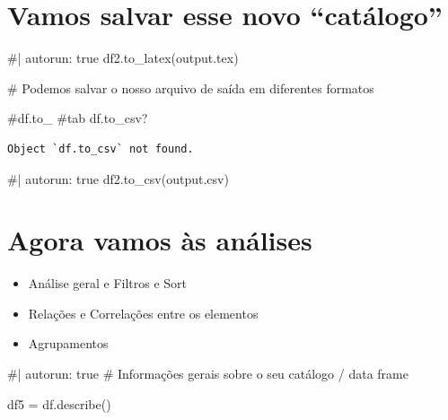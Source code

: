 \documentclass[
  letterpaper,
  DIV=11,
  numbers=noendperiod]{scrreprt}
\newenvironment{Shaded}{\begin{snugshade}}{\end{snugshade}}
\newcommand{\CommentTok}[1]{\textcolor[rgb]{0.37,0.37,0.37}{#1}}
\newcommand{\NormalTok}[1]{\textcolor[rgb]{0.00,0.23,0.31}{#1}}
\providecommand{\tightlist}{%
  \setlength{\itemsep}{0pt}\setlength{\parskip}{0pt}}
\begin{document}
\section{Vamos salvar esse novo
``catálogo''}\label{vamos-salvar-esse-novo-catuxe1logo}

\begin{Shaded}
\begin{Highlighting}[]
\NormalTok{\#| autorun: true}
\NormalTok{df2.to\_latex(\textquotesingle{}output.tex\textquotesingle{})}
\end{Highlighting}
\end{Shaded}

\begin{Shaded}
\begin{Highlighting}[]
\CommentTok{\# Podemos salvar o nosso arquivo de saída em diferentes formatos}

\CommentTok{\#df.to\_ \#tab}
\NormalTok{df.to\_csv?}
\end{Highlighting}
\end{Shaded}

\begin{verbatim}
Object `df.to_csv` not found.
\end{verbatim}

\begin{Shaded}
\begin{Highlighting}[]
\NormalTok{\#| autorun: true}
\NormalTok{df2.to\_csv(\textquotesingle{}output.csv\textquotesingle{})}
\end{Highlighting}
\end{Shaded}

\section{Agora vamos às análises}\label{agora-vamos-uxe0s-anuxe1lises}

\begin{itemize}
\tightlist
\item
  Análise geral e Filtros e Sort
\item
  Relações e Correlações entre os elementos
\item
  Agrupamentos
\end{itemize}

\begin{Shaded}
\begin{Highlighting}[]
\NormalTok{\#| autorun: true}
\NormalTok{\# Informações gerais sobre o seu catálogo / data frame}

\NormalTok{df5 = df.describe()}
\end{Highlighting}
\end{Shaded}
\end{document}
